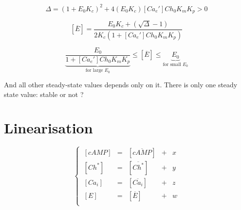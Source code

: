 \documentclass[aps,12pt]{revtex4}
\begin{document}
\begin{equation}
	\Delta =	(1+E_0 K_c)^2 + 4 (E_0 K_c) [Ca_e'] Ch_0    K_m  K_p > 0
\end{equation}

\begin{equation}
\boxed{
	[\overline{E}] = \dfrac{E_0 K_c + \left(\sqrt{\Delta} - 1\right)}
	{
	2 K_c(1+[Ca_e'] Ch_0 K_m K_p)
	}
}
\end{equation}

\begin{equation}
	\underbrace{\dfrac{E_0}{1+[Ca_e'] Ch_0 K_m K_p}}_{\text{for large $E_0$}}
		\leq	[\overline{E}] \leq \underbrace{E_0}_{\text{for small $E_0$}}
\end{equation}

And all other steady-state values depends only on it.
There is only one steady state value: stable or not ?

\section{Linearisation}

\begin{equation}
\left\lbrace
\begin{array}{lclcl}
~[cAMP] & = & [\overline{cAMP}] & + & x\\
~[Ch^\ast] & = & [\overline{Ch^\ast}] & + & y\\
~[Ca_i]    & = & [\overline{Ca_i}]    & + & z\\
~[E]       & = & [\overline{E}] & + & w\\
\end{array}
\right.
\end{equation}
\end{document}
